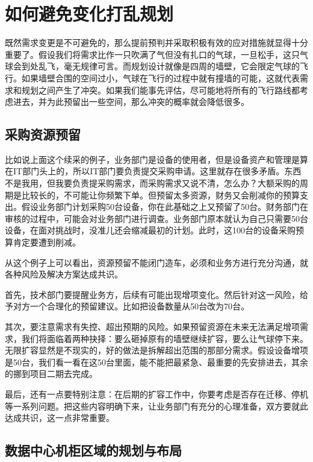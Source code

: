 \documentclass[12pt,UTF8]{ctexbook}
\begin{document}
\section{如何避免变化打乱规划}

既然需求变更是不可避免的，那么提前预判并采取积极有效的应对措施就显得十分重要了。假设我们将需求比作一只吹满了气但没有扎口的气球，一旦松手，这只气球会到处乱飞，毫无规律可言。而规划设计就像是四周的墙壁，它会限定气球的飞行。如果墙壁合围的空间过小，气球在飞行的过程中就有撞墙的可能，这就代表需求和规划之间产生了冲突。如果我们能事先评估，尽可能地将所有的飞行路线都考虑进去，并为此预留出一些空间，那么冲突的概率就会降低很多。

\subsection{采购资源预留}

比如说上面这个续采的例子，业务部门是设备的使用者，但是设备资产和管理是算在IT部门头上的，所以IT部门要负责提交采购申请。这里就存在很多矛盾。东西不是我用，但我要负责提采购需求，而采购需求又说不清，怎么办？大额采购的周期是比较长的，不可能让你频繁下单。但预留太多资源，财务又会削减你的预算支出。假设业务部门计划采购50台设备，你在此基础之上又预留了50台。财务部门在审核的过程中，可能会对业务部门进行调查。业务部门原本就认为自己只需要50台设备，在面对挑战时，没准儿还会缩减最初的计划。此时，这100台的设备采购预算肯定要遭到削减。

从这个例子上可以看出，资源预留不能闭门造车，必须和业务方进行充分沟通，就各种风险及解决方案达成共识。

首先，技术部门要提醒业务方，后续有可能出现增项变化。然后针对这一风险，给予对方一个合理化的预留建议。比如把设备数量从50台改为70台。

其次，要注意需求有失控、超出预期的风险。如果预留资源在未来无法满足增项需求，我们将面临着两种抉择：要么砸掉原有的墙壁继续扩容，要么让气球停下来。无限扩容显然是不现实的，好的做法是拆解超出范围的那部分需求。假设设备增项是50台，我们看一看在这50台里面，能不能把最紧急、最重要的先安排进去，其余的挪到项目二期去完成。

最后，还有一点要特别注意：在后期的扩容工作中，你要考虑是否存在迁移、停机等一系列问题。把这些内容明确下来，让业务部门有充分的心理准备，双方要就此达成共识，这一点非常重要。

\subsection{数据中心机柜区域的规划与布局}
\end{document}
